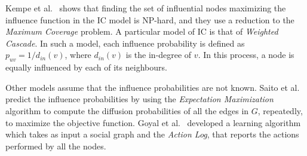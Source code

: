 Kempe et al.~\cite{Kempe2003} shows that finding the set of influential nodes maximizing the influence function in the IC model is NP-hard, and they use a reduction to the {\em Maximum Coverage} problem. A particular model of IC is that of \emph{Weighted Cascade}. In such a model, each influence probability is defined as $p_{uv}=1/d_{in}(v)$, where $d_{in}(v)$ is the in-degree of $v$. In this process, a node is equally influenced by each of its neighbours. 

Other models assume that the influence probabilities are not known. Saito et al.~\cite{Saito2008} predict the influence probabilities by using the \emph{Expectation Maximization} algorithm to compute the diffusion probabilities of all the edges in $G$,  repeatedly, to maximize the objective function. Goyal et al.~\cite{Goyal2010} developed a learning algorithm which takes as input a social graph and the \emph{Action Log}, that reports the actions performed by all the nodes. 


